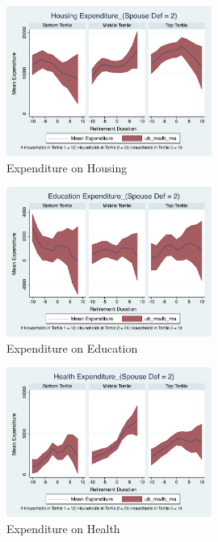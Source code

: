 \documentclass[11pt]{article}
\begin{document}
\clearpage

\begin{figure}[h]
	\caption{Expenditure on Housing}
	\centering
	\includegraphics[width=0.6\textwidth]{../ConsumptionPostRetirement_by_SpouseDef_Cats/Smoothed/2/spouse_def_total_housing_real.pdf}
\end{figure}


\begin{figure}[h]
	\caption{Expenditure on Education}
	\centering
	\includegraphics[width=0.6\textwidth]{../ConsumptionPostRetirement_by_SpouseDef_Cats/Smoothed/2/spouse_def_total_education_real.pdf}
\end{figure}
\clearpage

\begin{figure}[h]
	\caption{Expenditure on Health}
	\centering
	\includegraphics[width=0.6\textwidth]{../ConsumptionPostRetirement_by_SpouseDef_Cats/Smoothed/2/spouse_def_total_healthexpense_real.pdf}
\end{figure}
\end{document}
